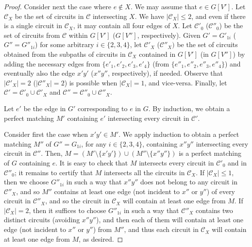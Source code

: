 \documentclass[]{theclass}
\begin{document}
\begin{proof}
Consider next the case where $e\notin X$. We may assume that $e\in G[V']$. 
Let $\mathcal{C}_X$ be the set of circuits in $\mathcal{C}$ intersecting $X$. We have $|\mathcal{C}_X|\le 2$, and even if there is a single circuit in $\mathcal{C}_X$, it may contain all four edges of $X$.
Let $\mathcal{C}'_0$ ($\mathcal{C}''_0$) be the set of circuits from $\mathcal{C}$ within $G[V']$ ($G[V'']$, respectively). 
Given $G'=G'_{1i}$ ($G''=G''_{1i}$) for some arbitrary $i\in\{2,3,4\}$, let $\mathcal{C}'_X$ ($\mathcal{C}''_X)$ be the set of circuits obtained from the subpaths of circuits in $\mathcal{C}_X$ contained in $G[V']$ (in $G[V'']$) by adding the necessary edges from $\{e'_1,e'_2,e'_3,e'_4\}$ (from $\{e''_1,e''_2,e''_3,e''_4\}$) and eventually also the edge $x'y'$ ($x''y''$, respectively), if needed. Observe that $|\mathcal{C}'_X|=2$ ($|\mathcal{C}''_X|=2$) is possible when $|\mathcal{C}_X|=1$, and vice-versa. Finally, let $\mathcal{C}'=\mathcal{C}'_0 \cup \mathcal{C}'_X$ and $\mathcal{C}''=\mathcal{C}''_0 \cup \mathcal{C}''_X$.

Let $e'$ be the edge in $G'$ corresponding to $e$ in $G$. By induction, we obtain a perfect matching $M'$ containing $e'$ intersecting every circuit in $\mathcal{C}'$. 

Consider first the case when $x'y'\in M'$. We apply induction to obtain a perfect matching $M''$ of $G''=G_{1i}$, for any $i\in\{2,3,4\}$, containing $x''y''$ intersecting every circuit in $\mathcal{C}''$. Then, $M=(M' \setminus \{x'y'\})\cup (M''\setminus \{x''y''\})$ is a perfect matching of $G$ containing $e$. It is easy to check that $M$ intersects every circuit in $\mathcal{C}'_0$ and in $\mathcal{C}''_0$; it remains to certify that $M$ intersects all the circuits in $\mathcal{C}_X$. If $|\mathcal{C}_X|\le 1$, then we choose $G''_{1i}$ in such a way that $x''y''$ does not belong to any circuit in $\mathcal{C}''_X$, and so $M''$ 
 contains at least one edge (not incident to $x''$ or $y''$) of every circuit in $\mathcal{C}''_X$, and so the circuit in $\mathcal{C}_X$ will contain at least one edge from $M$.
 If $|\mathcal{C}_X|=2$, then it suffices to choose $G''_{1i}$ in such a way that $\mathcal{C}''_X$ contains two distinct circuits (avoiding $x''y''$), and then each of them will contain at least one edge (not incident to $x''$ or $y''$) from $M''$, and thus each circuit in $\mathcal{C}_X$ will contain at least one edge from $M$, as desired.


\end{proof}
\end{document}
